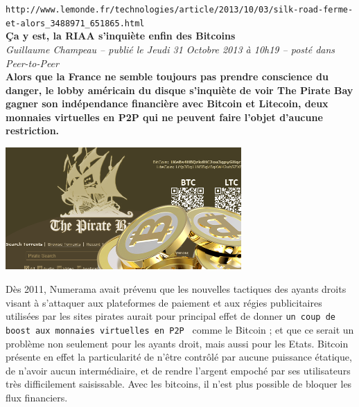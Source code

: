 \documentclass[11pt,twoside,a4paper]{article}
\begin{document}
\vfill

\clearpage

\texttt{http://www.lemonde.fr/technologies/article/2013/10/03/silk-road-ferme-et-alors\_3488971\_651865.html}~\\

\textbf{\c{C}a y est, la RIAA s'inqui{\`e}te enfin des Bitcoins}~\\

\emph{\small  Guillaume Champeau -- publi{\'e} le Jeudi 31 Octobre 2013 {\`a} 10h19 -- post{\'e} dans Peer-to-Peer }~\\

\textbf{Alors que la France ne semble toujours pas prendre conscience du danger, le lobby am{\'e}ricain du disque s'inqui{\`e}te de voir The Pirate Bay gagner son ind{\'e}pendance financi{\`e}re avec Bitcoin et Litecoin, deux monnaies virtuelles en P2P qui ne peuvent faire l'objet d'aucune restriction. }~\\

\begin{minipage}[ht]{9.25cm}
	\includegraphics[width=9.00cm]{img/bittorrent-bitcoins.png}
\end{minipage} \hfill \begin{minipage}[ht]{10.00cm}
	D{\`e}s 2011, Numerama avait pr{\'e}venu que les nouvelles tactiques des ayants droits visant {\`a} s'attaquer aux plateformes de paiement et aux r{\'e}gies publicitaires utilis{\'e}es par les sites pirates aurait pour principal effet de donner \texttt{un coup de boost aux monnaies virtuelles en P2P~\footnotemark} comme le Bitcoin ; et que ce serait un probl{\`e}me non seulement pour les ayants droit, mais aussi pour les Etats. Bitcoin pr{\'e}sente en effet la particularit{\'e} de n'{\^e}tre contr{\^o}l{\'e} par aucune puissance {\'e}tatique, de n'avoir aucun interm{\'e}diaire, et de rendre l'argent empoch{\'e} par ses utilisateurs tr{\`e}s difficilement saisissable. Avec les bitcoins, il n'est plus possible de bloquer les flux financiers. ~\\ 
\end{minipage}~\\
\end{document}
